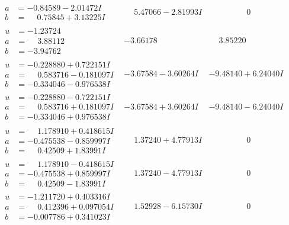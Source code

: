 \documentclass[1p]{elsarticle_modified}
\theoremstyle{definition}
\begin{document}
$$\begin{array}{c|c|c}
\begin{aligned}
a &= -0.84589 - 2.01472 I \\
b &= \phantom{-}0.75845 + 3.13225 I\end{aligned}
 & \phantom{-}5.47066 - 2.81993 I & \phantom{-0.000000 } 0 \\ \hline\begin{aligned}
u &= -1.23724\phantom{ +0.000000I} \\
a &= \phantom{-}3.88112\phantom{ +0.000000I} \\
b &= -3.94762\phantom{ +0.000000I}\end{aligned}
 & -3.66178\phantom{ +0.000000I} & \phantom{-}3.85220\phantom{ +0.000000I} \\ \hline\begin{aligned}
u &= -0.228880 + 0.722151 I \\
a &= \phantom{-}0.583716 - 0.181097 I \\
b &= -0.334046 - 0.976538 I\end{aligned}
 & -3.67584 - 3.60264 I & -9.48140 + 6.24040 I \\ \hline\begin{aligned}
u &= -0.228880 - 0.722151 I \\
a &= \phantom{-}0.583716 + 0.181097 I \\
b &= -0.334046 + 0.976538 I\end{aligned}
 & -3.67584 + 3.60264 I & -9.48140 - 6.24040 I \\ \hline\begin{aligned}
u &= \phantom{-}1.178910 + 0.418615 I \\
a &= -0.475538 - 0.859997 I \\
b &= \phantom{-}0.42509 + 1.83991 I\end{aligned}
 & \phantom{-}1.37240 + 4.77913 I & \phantom{-0.000000 } 0 \\ \hline\begin{aligned}
u &= \phantom{-}1.178910 - 0.418615 I \\
a &= -0.475538 + 0.859997 I \\
b &= \phantom{-}0.42509 - 1.83991 I\end{aligned}
 & \phantom{-}1.37240 - 4.77913 I & \phantom{-0.000000 } 0 \\ \hline\begin{aligned}
u &= -1.211720 + 0.403316 I \\
a &= \phantom{-}0.412396 + 0.097054 I \\
b &= -0.007786 + 0.341023 I\end{aligned}
 & \phantom{-}1.52928 - 6.15730 I & \phantom{-0.000000 } 0 \\ \hline\begin{aligned}

\end{aligned}
\end{array}$$
\end{document}
